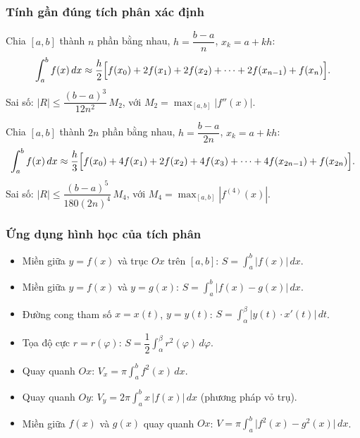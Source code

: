 \documentclass[12pt,a4paper]{article}
\begin{document}
\subsubsection{Tính gần đúng tích phân xác định}

\begin{congthuc}[title={Công thức hình thang}]
  Chia $[a,b]$ thành $n$ phần bằng nhau, $h = \dfrac{b-a}{n}$, $x_k = a + kh$:
  \[
    \int_a^b f(x)\,dx \approx \frac{h}{2}\Bigl[f(x_0) + 2f(x_1) + 2f(x_2) + \cdots + 2f(x_{n-1}) + f(x_n)\Bigr].
  \]
  Sai số: $|R| \le \dfrac{(b-a)^3}{12n^2}\,M_2$, với $M_2 = \max_{[a,b]}|f''(x)|$.
\end{congthuc}

\begin{congthuc}[title={Công thức Simpson (parabol)}]
  Chia $[a,b]$ thành $2n$ phần bằng nhau, $h = \dfrac{b-a}{2n}$, $x_k = a + kh$:
  \[
    \int_a^b f(x)\,dx \approx \frac{h}{3}\Bigl[f(x_0) + 4f(x_1) + 2f(x_2) + 4f(x_3) + \cdots + 4f(x_{2n-1}) + f(x_{2n})\Bigr].
  \]
  Sai số: $|R| \le \dfrac{(b-a)^5}{180(2n)^4}\, M_4$, với $M_4 = \max_{[a,b]}|f^{(4)}(x)|$.
\end{congthuc}

\subsubsection{Ứng dụng hình học của tích phân}

\begin{congthuc}[title={Diện tích hình phẳng}]
  \begin{itemize}
    \item Miền giữa $y = f(x)$ và trục $Ox$ trên $[a,b]$: $S = \displaystyle\int_a^b |f(x)|\,dx$.
    \item Miền giữa $y = f(x)$ và $y = g(x)$: $S = \displaystyle\int_a^b |f(x) - g(x)|\,dx$.
    \item Đường cong tham số $x = x(t)$, $y = y(t)$: $S = \displaystyle\int_\alpha^\beta |y(t) \cdot x'(t)|\,dt$.
    \item Tọa độ cực $r = r(\varphi)$: $S = \dfrac{1}{2}\displaystyle\int_\alpha^\beta r^2(\varphi)\,d\varphi$.
  \end{itemize}
\end{congthuc}

\begin{congthuc}[title={Thể tích vật thể tròn xoay}]
  \begin{itemize}
    \item Quay quanh $Ox$: $V_x = \pi\displaystyle\int_a^b f^2(x)\,dx$.
    \item Quay quanh $Oy$: $V_y = 2\pi\displaystyle\int_a^b x\,|f(x)|\,dx$ (phương pháp vỏ trụ).
    \item Miền giữa $f(x)$ và $g(x)$ quay quanh $Ox$: $V = \pi\displaystyle\int_a^b \bigl|f^2(x) - g^2(x)\bigr|\,dx$.
  \end{itemize}
\end{congthuc}
\end{document}
